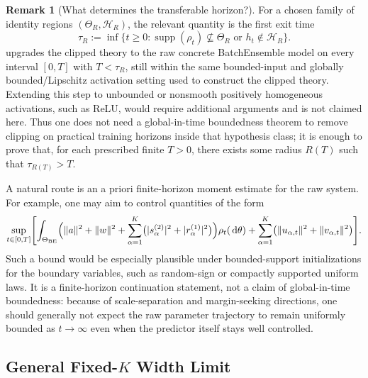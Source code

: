 \documentclass[11pt]{article}
\theoremstyle{definition}
\newtheorem{remark}[theorem]{Remark}
\newcommand{\dd}{\,\mathrm{d}}
\begin{document}
\begin{remark}[What determines the transferable horizon?]
\label{rem:transfer-horizon}
For a chosen family of identity regions $(\Theta_R,\mathcal H_R)$, the
relevant quantity is the first exit time
\[
  \tau_R
  :=
  \inf\bigl\{
    t\ge 0
    :
    \operatorname{supp}(\rho_t)\nsubseteq\Theta_R
    \text{ or }
    h_t\notin\mathcal H_R
  \bigr\}.
\]
 upgrades the clipped theory to the raw concrete
BatchEnsemble model on every interval $[0,T]$ with $T<\tau_R$, still within the
same bounded-input and globally bounded/Lipschitz activation setting used to
construct the clipped theory. Extending this step to unbounded or nonsmooth
positively homogeneous activations, such as ReLU, would require additional
arguments and is not claimed here. Thus one does not need a global-in-time
boundedness theorem to remove clipping on practical training horizons inside
that hypothesis class; it is enough to prove that, for each prescribed finite
$T>0$, there exists some radius $R(T)$ such that $\tau_{R(T)}>T$.

A natural route is an a priori finite-horizon moment estimate for the raw
system. For example, one may aim to control quantities of the form
\[
  \sup_{t\in[0,T]}
  \Biggl[
    \int_{\Theta_{\mathrm{BE}}}
    \Bigl(
      \|a\|^2+\|w\|^2
      +\sum_{\alpha=1}^K
      \bigl(
        |s_\alpha^{(2)}|^2+|r_\alpha^{(1)}|^2
      \bigr)
    \Bigr)\rho_t(\dd\theta)
    +
    \sum_{\alpha=1}^K
    \bigl(
      \|u_{\alpha,t}\|^2+\|v_{\alpha,t}\|^2
    \bigr)
  \Biggr].
\]
Such a bound would be especially plausible under bounded-support
initializations for the boundary variables, such as random-sign or compactly
supported uniform laws. It is a finite-horizon continuation statement, not a
claim of global-in-time boundedness: because of scale-separation and
margin-seeking directions, one should generally not expect the raw parameter
trajectory to remain uniformly bounded as $t\to\infty$ even when the predictor
itself stays well controlled.
\end{remark}

\subsection{General Fixed-\texorpdfstring{$K$}{K} Width Limit}
\label{sec:appendix-general-limit}
\end{document}
